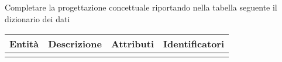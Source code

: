 \begin{templateblock}
    Completare la progettazione concettuale riportando nella tabella seguente
    il dizionario dei dati
\end{templateblock}

\begin{tabularx}{\linewidth}{|c|Y|c|c|}
    \hline
    \textbf{Entità} & \textbf{Descrizione} & \textbf{Attributi} & \textbf{Identificatori} \\\hline
                    &                      &                    &                         \\ \hline
\end{tabularx}
